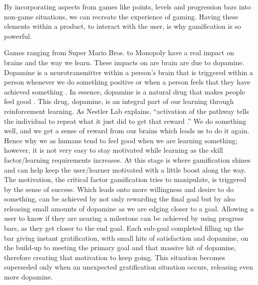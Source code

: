 		By incorporating aspects from games like points, levels and progression bars into non-game situations, we can recreate the experience of gaming. Having these elements within a product, to interact with the user, is why gamification is so powerful.
		
		Games ranging from Super Mario Bros. to Monopoly have a real impact on brains and the way we learn. These impacts on are brain are due to dopamine. Dopamine is a neurotransmitter within a person’s brain that is triggered within a person whenever we do something positive or when a person feels that they have achieved something \cite{dopamine}. In essence, dopamine is a natural drug that makes people feel good \cite{sciencebehind}. This drug, dopamine, is an integral part of our learning through reinforcement learning. As Nestler Lab explains, “activation of the pathway tells the individual to repeat what it just did to get that reward \cite{sciencebehind, brainrewards}.” We do something well, and we get a sense of reward from our brains which leads us to do it again. Hence why we as humans tend to feel good when we are learning something; however, it is not very easy to stay motivated while learning as the skill factor/learning requirements increases. At this stage is where gamification shines and can help keep the user/learner motivated with a little boost along the way. The motivation, the critical factor gamification tries to manipulate, is triggered by the sense of success. Which leads onto more willingness and desire to do something, can be achieved by not only rewarding the final goal but by also releasing small amounts of dopamine as we are edging closer to a goal. Allowing a user to know if they are nearing a milestone can be achieved by using progress bars, as they get closer to the end goal. Each sub-goal completed filling up the bar giving instant gratification, with small hits of satisfaction and dopamine, on the build-up to meeting the primary goal and that massive hit of dopamine, therefore creating that motivation to keep going. This situation becomes superseded only when an unexpected gratification situation occurs, releasing even more dopamine.
		
